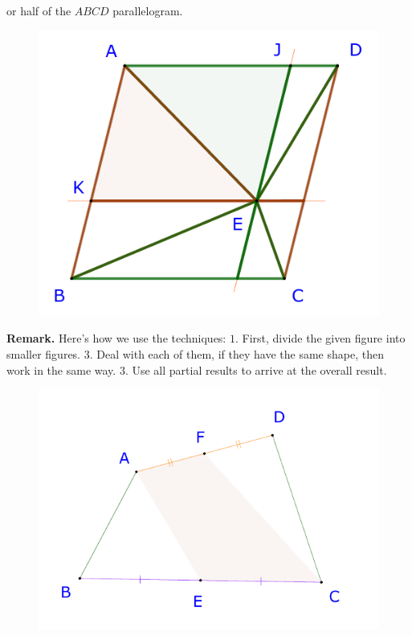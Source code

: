 \begin{multicols}{2}
	or half of the $ABCD$ parallelogram.
	\begin{figure}[H]
		\centering
		\captionsetup{labelformat= empty, justification=centering}
		\includegraphics[width= 0.95\linewidth]{23-24-s3-i-p1-s.pdf}
		\vspace*{-10pt} 
	\end{figure}
	\textbf{\color{toancuabi}Remark.} Here's how we use the techniques:
	\vskip 0.1cm
	$1.$ First, divide the given figure into smaller figures.
	\vskip 0.1cm
	$3$. Deal with each of them, if they have the same shape, then work in the same way.
	\vskip 0.1cm
	$3.$ Use all partial results to arrive at the overall result.
	\vskip 0.2cm
	\begin{figure}[H]
		\vspace*{-10pt}
		\centering
		\captionsetup{labelformat= empty, justification=centering}
		\includegraphics[width= 1\linewidth]{23-24-s3-i-p2.pdf}

\end{figure}
\end{multicols}
